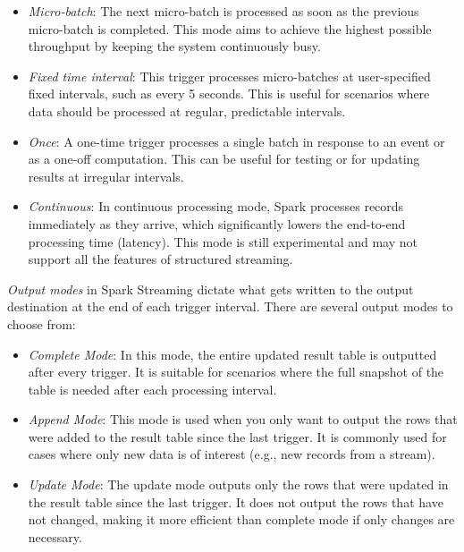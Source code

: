 \begin{itemize}
\item \emph{Micro-batch}: The next micro-batch is processed as soon as the previous micro-batch is completed. This mode aims to achieve the highest possible throughput by keeping the system continuously busy.

\item \emph{Fixed time interval}: This trigger processes micro-batches at user-specified fixed intervals, such as every 5 seconds. This is useful for scenarios where data should be processed at regular, predictable intervals.

\item \emph{Once}: A one-time trigger processes a single batch in response to an event or as a one-off computation. This can be useful for testing or for updating results at irregular intervals.

\item \emph{Continuous}: In continuous processing mode, Spark processes records immediately as they arrive, which significantly lowers the end-to-end processing time (latency). This mode is still experimental and may not support all the features of structured streaming.
\end{itemize}

\emph{Output modes} in Spark Streaming dictate what gets written to the output destination at the end of each trigger interval. There are several output modes to choose from:

\begin{itemize}
\item \emph{Complete Mode}: In this mode, the entire updated result table is outputted after every trigger. It is suitable for scenarios where the full snapshot of the table is needed after each processing interval.

\item \emph{Append Mode}: This mode is used when you only want to output the rows that were added to the result table since the last trigger. It is commonly used for cases where only new data is of interest (e.g., new records from a stream).

\item \emph{Update Mode}: The update mode outputs only the rows that were updated in the result table since the last trigger. It does not output the rows that have not changed, making it more efficient than complete mode if only changes are necessary.
\end{itemize}

